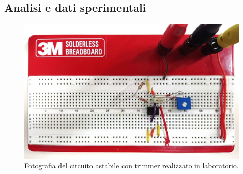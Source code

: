 \documentclass{report}
\begin{document}
\subsection{Analisi e dati sperimentali}
\begin{figure}[h!]
	\centering
	\includegraphics[height=7cm]{immagini/circuito4}
	\caption{Fotografia del circuito astabile con trimmer realizzato in laboratorio.}
	\label{figura:circuito4}
\end{figure}

\end{document}

